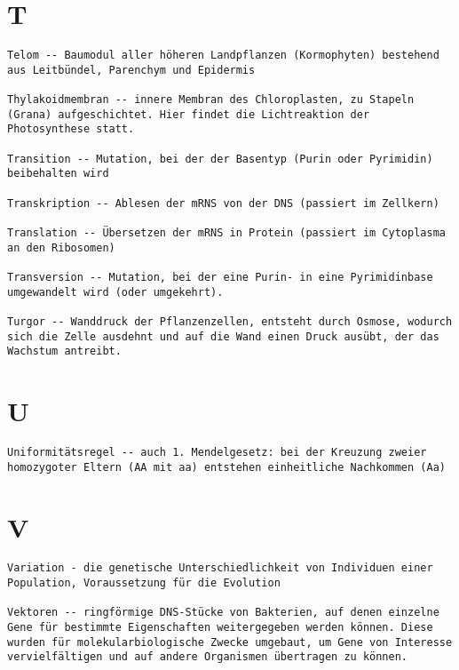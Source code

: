 \documentclass{article}
\begin{document}
\section{T}
\begin{verbatim}
Telom -- Baumodul aller höheren Landpflanzen (Kormophyten) bestehend aus Leitbündel, Parenchym und Epidermis

Thylakoidmembran -- innere Membran des Chloroplasten, zu Stapeln (Grana) aufgeschichtet. Hier findet die Lichtreaktion der Photosynthese statt.

Transition -- Mutation, bei der der Basentyp (Purin oder Pyrimidin) beibehalten wird

Transkription -- Ablesen der mRNS von der DNS (passiert im Zellkern)

Translation -- Übersetzen der mRNS in Protein (passiert im Cytoplasma an den Ribosomen)

Transversion -- Mutation, bei der eine Purin- in eine Pyrimidinbase umgewandelt wird (oder umgekehrt).

Turgor -- Wanddruck der Pflanzenzellen, entsteht durch Osmose, wodurch sich die Zelle ausdehnt und auf die Wand einen Druck ausübt, der das Wachstum antreibt.

\end{verbatim}
\newpage


\section{U}
\begin{verbatim}
Uniformitätsregel -- auch 1. Mendelgesetz: bei der Kreuzung zweier homozygoter Eltern (AA mit aa) entstehen einheitliche Nachkommen (Aa)

\end{verbatim}
\newpage


\section{V}
\begin{verbatim}
Variation - die genetische Unterschiedlichkeit von Individuen einer Population, Voraussetzung für die Evolution

Vektoren -- ringförmige DNS-Stücke von Bakterien, auf denen einzelne Gene für bestimmte Eigenschaften weitergegeben werden können. Diese wurden für molekularbiologische Zwecke umgebaut, um Gene von Interesse vervielfältigen und auf andere Organismen übertragen zu können.
\end{verbatim}
\newpage
\end{document}
